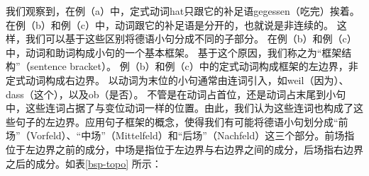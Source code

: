 我们观察到，在例（a）中，定式动词hat只跟它的补足语gegessen（吃完）挨着。在例（b）和例（c）中，动词跟它的补足语是分开的，也就说是非连续的。
这样，我们可以基于这些区别将德语小句分成不同的子部分。
在例（b）和例（c）中，动词和助词构成小句的一个基本框架。
基于这个原因，我们称之为“框架结构”（sentence bracket）。
例（b）和例（c）中的定式动词构成框架的左边界，非定式动词构成右边界。
以动词为末位的小句通常由连词引入，如weil（因为）、dass（这个），以及ob（是否）。
不管是在动词占首位，还是动词占末尾到小句中，这些连词占据了与变位动词一样的位置。由此，我们认为这些连词也构成了这些句子的左边界。应用句子框架的概念，使得我们有可能将德语小句划分成“前场”（Vorfeld）、“中场”（Mittelfeld）和“后场”（Nachfeld）这三个部分。前场指位于左边界之前的成分，中场是指位于左边界与右边界之间的成分，后场指右边界之后的成分。如表\vref{bsp-topo} 所示：
%
